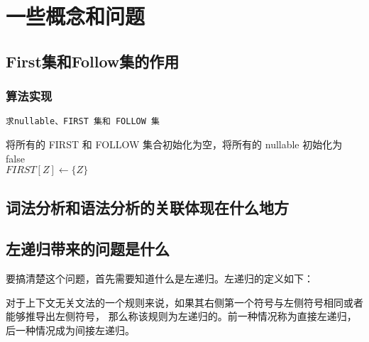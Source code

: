 \chapter{一些概念和问题}

\section*{First集和Follow集的作用}


\subsection*{算法实现}

\begin{algorithm}[H]
    \renewcommand{\thealgocf}{}
    \caption{\texttt{求nullable、FIRST 集和 FOLLOW 集}}
将所有的 FIRST 和 FOLLOW 集合初始化为空，将所有的 nullable 初始化为 false \\
 {
	$FIRST[Z] \leftarrow \{Z\}$
}

 {
 {
	 {
	}
}
}

\end{algorithm}


\section*{词法分析和语法分析的关联体现在什么地方}


\section*{左递归带来的问题是什么}

要搞清楚这个问题，首先需要知道什么是左递归。左递归的定义如下：

\begin{definition}[左递归] \label{def:int}
对于上下文无关文法的一个规则来说，如果其右侧第一个符号与左侧符号相同或者能够推导出左侧符号，
那么称该规则为左递归的。前一种情况称为直接左递归，后一种情况成为间接左递归。
\end{definition}

